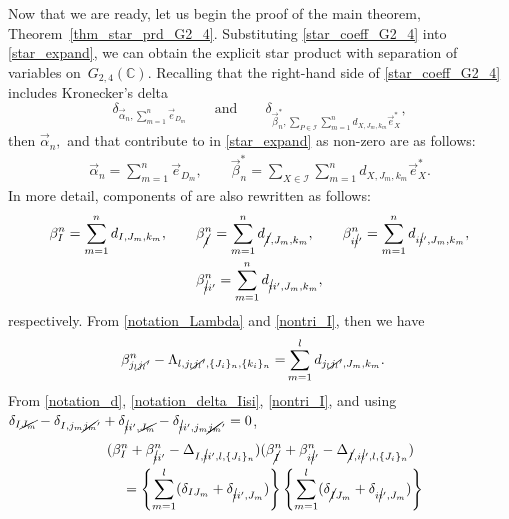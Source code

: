 \documentclass[pdftex]{sigma}
\numberwithin{equation}{section}
\begin{document}
Now that we are ready, let us begin the proof of the main theorem, Theorem~\ref{thm_star_prd_G2_4}.
Substituting \eqref{star_coeff_G2_4} into
\eqref{star_expand}, we can obtain the explicit star product with separation of variables on~$G_{2,4}(\mathbb{C})$. Recalling that the right-hand side of \eqref{star_coeff_G2_4} includes Kronecker's delta
\[
 \delta_{
 \vec{\alpha}_{n},
 \sum_{m=1}^{n}
 \vec{e}_{D_{m}}
 }
\qquad \text{and}\qquad
 \delta_{
 \vec{\beta}_{n}^{\ast},
 \sum_{
 P
 \in
 \mathcal{I}
 }
 \sum_{m=1}^{n}
 d_{
 X,
 J_{m},
 k_{m}
 }
 \vec{e}_{X}^{\ast} },
\]
then
$
\vec{\alpha}_{n},
$
and
that contribute to
in %
\eqref{star_expand} as non-zero are as follows:
\begin{align*}
 \vec{\alpha}_{n}
 =
 \sum_{m=1}^{n}
 \vec{e}_{D_{m}},
 \qquad
 \vec{\beta}_{n}^{\ast}
 =
 \sum_{
 X
 \in
 \mathcal{I}
 }
 \sum_{m=1}^{n}
 d_{
 X,
 J_{m},
 k_{m}
 }
 \vec{e}_{X}^{\ast}.
\end{align*}
In more detail, components of  are also rewritten as follows:
\begin{gather}
 \beta_{I}^{n}
 =
 \sum_{m=1}^{n}
 d_{
 I,
 J_{m},
 k_{m}
 },
 \qquad
 \beta_{\cancel{I}}^{n}
 =
 \sum_{m=1}^{n}
 d_{
 \cancel{I},
 J_{m},
 k_{m}
 },
 \qquad
 \beta_{i\cancel{i}'}^{n}
 =
 \sum_{m=1}^{n}
 d_{
 i\cancel{i}',
 J_{m},
 k_{m}
 },\nonumber
 \\
 \beta_{\cancel{i}i'}^{n}
 =
 \sum_{m=1}^{n}
 d_{
 \cancel{i}i',
 J_{m},
 k_{m}
 },
 \label{nontri_I}
\end{gather}
respectively.
From \eqref{notation_Lambda} and \eqref{nontri_I}, then we have
\begin{align*}
 \beta_{j_{l}\cancel{j_{l}}'}^{n}
 -
 \Lambda_{
 l,
 j_{l}\cancel{j_{l}}',
 \{
 J_{i}
 \}_{n},
 \{
 k_{i}
 \}_{n}
 }
 =&
 \sum_{m=1}^{l}
 d_{
 j_{l}\cancel{j_{l}}',
 J_{m},
 k_{m}
 }
 .
\end{align*}
From \eqref{notation_d}, \eqref{notation_delta_Iisi}, \eqref{nontri_I}, and using
$
\delta_{I\cancel{J_{m}}}
-
\delta_{I,j_{m}\cancel{j_{m}}'}
+
\delta_{\cancel{i}i',\cancel{J_{m}}}
-
\delta_{\cancel{i}i',j_{m}\cancel{j_{m}}'}
=
0
$,
\begin{gather*}
 (
 \beta_{I}^{n}
 +
 \beta_{\cancel{i}i'}^{n}
 -
 \Delta_{
 I,
 \cancel{i}i',
 l,
 \{
 J_{i}
 \}_{n}
 }
 )
 (
 \beta_{\cancel{I}}^{n}
 +
 \beta_{i\cancel{i}'}^{n}
 -
 \Delta_{
 \cancel{I},
 i\cancel{i}',
 l,
 \{
 J_{i}
 \}_{n}
 }
 )\\
 \qquad
 =
 \left\{
 \sum_{m=1}^{l}
 (
 \delta_{IJ_{m}}
 +
 \delta_{\cancel{i}i',J_{m}}
 )
 \right\}
 \left\{
 \sum_{m=1}^{l}
 (
 \delta_{\cancel{I}J_{m}}
 +
 \delta_{i\cancel{i}',J_{m}}
 )
 \right\}
\end{gather*}
\end{document}
